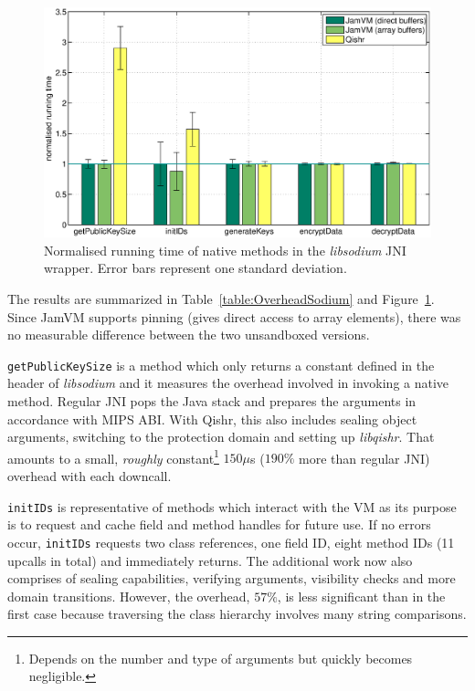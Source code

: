 \documentclass[a4paper,12pt,twoside,openright]{report}
\newcommand{\tool}[1]{\emph{#1}}
\newcommand{\lib}[1]{\tool{lib#1}}
\begin{document}
\begin{figure}[t]
	\centering
	\includegraphics[width=1.1\textwidth]{graph_sodium.eps}
	\caption{Normalised running time of native methods in the \lib{sodium} JNI wrapper. Error bars represent one standard deviation.}
	\label{fig:OverheadSodium}
\end{figure}

The results are summarized in Table~\ref{table:OverheadSodium} and Figure~\ref{fig:OverheadSodium}. Since JamVM supports pinning (gives direct access to array elements), there was no measurable difference between the two unsandboxed versions. 

\texttt{getPublicKeySize} is a method which only returns a constant defined in the header of \lib{sodium} and it measures the overhead involved in invoking a native method. Regular JNI pops the Java stack and prepares the arguments in accordance with MIPS ABI. With Qishr, this also includes sealing object arguments, switching to the protection domain and setting up \lib{qishr}. That amounts to a small, \emph{roughly} constant\footnote{Depends on the number and type of arguments but quickly becomes negligible.} $150 \mu$s ($190\%$ more than regular JNI) overhead with each downcall.

\texttt{initIDs} is representative of methods which interact with the VM as its purpose is to request and cache field and method handles for future use. If no errors occur, \texttt{initIDs} requests two class references, one field ID, eight method IDs (11 upcalls in total) and immediately returns. The additional work now also comprises of sealing capabilities, verifying arguments, visibility checks and more domain transitions. However, the overhead, $57\%$, is less significant than in the first case because traversing the class hierarchy involves many string comparisons. 
\end{document}
